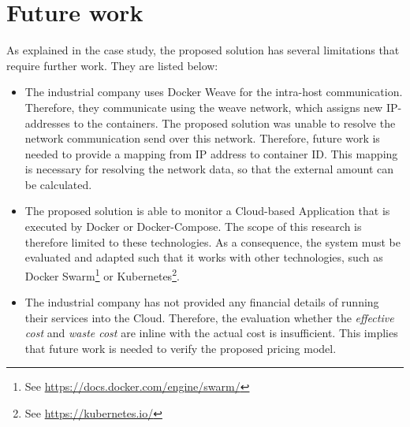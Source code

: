 \section{Future work} \label{sec:future_work}
As explained in the case study, the proposed solution has several limitations that require further work. They are listed below:

\begin{itemize}
    \item The industrial company uses Docker Weave for the intra-host communication. Therefore, they communicate using the weave network, which assigns new IP-addresses to the containers. The proposed solution was unable to resolve the network communication send over this network. Therefore, future work is needed to provide a mapping from IP address to container ID. This mapping is necessary for resolving the network data, so that the external amount can be calculated.
    \item The proposed solution is able to monitor a Cloud-based Application that is executed by Docker or Docker-Compose. The scope of this research is therefore limited to these technologies. As a consequence, the system must be evaluated and adapted such that it works with other technologies, such as Docker Swarm\footnote{See \url{https://docs.docker.com/engine/swarm/}} or Kubernetes\footnote{See \url{https://kubernetes.io/}}.
    \item The industrial company has not provided any financial details of running their services into the Cloud. Therefore, the evaluation whether the \textit{effective cost} and \textit{waste cost} are inline with the actual cost is insufficient. This implies that future work is needed to verify the proposed pricing model.
\end{itemize}